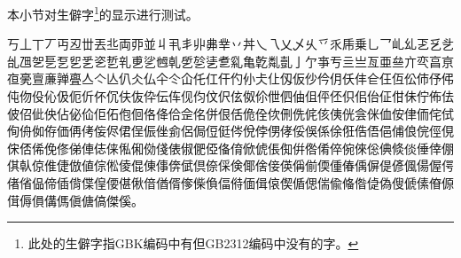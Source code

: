 本小节对生僻字\footnote{此处的生僻字指GBK编码中有但GB2312编码中没有的字。}的显示进行测试。

丂丄丅丆丏丒丗丟丠両丣並丩丮丯丱丳丵丷丼乀乁乂乄乆乊乑乕乗乚乛乢乣乤乥乧乨乪乫乬乭乮乯乲乴乵乶乷乸乹乺乻乼乽乿亀亁亃亄亅亇亊亐亖亗亙亜亝亣亪亯亰亱亴亶亷亸亹亼亽亾仈仌仏仐仒仚仛仜仠仢仦仧仩仭仮仯仱仴仸仹仺仼仾伀伂伃伄伅伆伇伈伋伌伒伓伔伕伖伜伝伡伣伨伩伬伭伮伱伳伵伷伹伻伾伿佀佁佂佄佅佇佈佉佊佋佌佒佔佖佡佢佦佨佪佫佭佮佱佲併佷佸佹佺佽侀侁侂侅侇侊侌侎侐侒侓侕侘侙侚侜侞侟価侢侤侫侭侰侱侲侳侴侶侷侸侹侺侻侼侽侾俀俁係俆俇俈俉俋俌俍俒俓俔俕俖俙俛俢俤俥俧俫俬俰俲俴俵俶俷俹俻俼俽俿倀倁倂倃倄倅倇倈倊倎倐倓倕倖倗倛倝倞倠倢倣値倧倯倰倱倲倳倴倵倶倷倸倹倻倽倿偀偁偂偄偅偆偊偋偍偐偑偒偓偔偖偗偘偙偛偝偞偟偠偡偢偣偤偦偧偨偩偪偫偭偮偯偰偱偲偳偸偹偺偼偽傁傂傃傄傆傇傉傊傋傌傎傏傐傑傒。